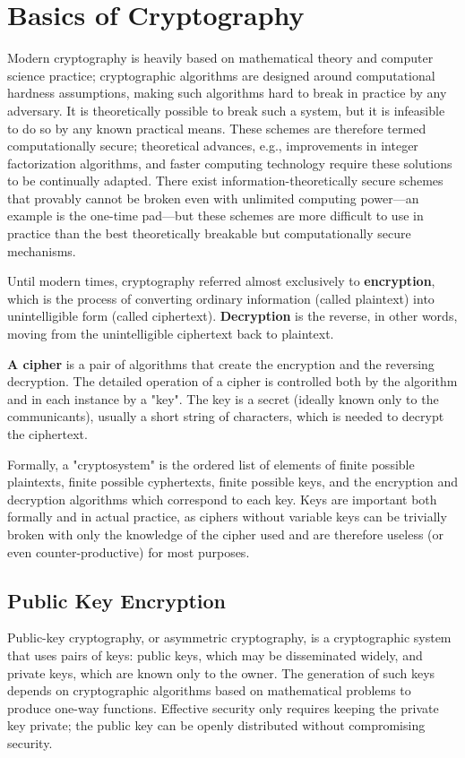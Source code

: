 \documentclass[a4paper]{article}
\begin{document}
  
  \newpage 
  \section{Basics of Cryptography}
  Modern cryptography is heavily based on mathematical theory and computer science practice; 
  cryptographic algorithms are designed around computational hardness assumptions, making such 
  algorithms hard to break in practice by any adversary. It is theoretically possible to break 
  such a system, but it is infeasible to do so by any known practical means. These schemes are 
  therefore termed computationally secure; theoretical advances, e.g., improvements in integer 
  factorization algorithms, and faster computing technology require these solutions to be 
  continually adapted. There exist information-theoretically secure schemes that provably 
  cannot be broken even with unlimited computing power—an example is the one-time pad—but 
  these schemes are more difficult to use in practice than the best theoretically breakable 
  but computationally secure mechanisms.

  Until modern times, cryptography referred almost exclusively to {\bfseries encryption}, 
  which is the process of converting ordinary information (called plaintext) into unintelligible form 
  (called ciphertext). {\bfseries Decryption} is the reverse, in other words, moving from the 
  unintelligible ciphertext back to plaintext. 
  
  {\bfseries A cipher} is a pair of algorithms that create the encryption and the reversing 
  decryption. The detailed operation of a cipher is controlled both by the algorithm and 
  in each instance by a "key". The key is a secret (ideally known only to the communicants), 
  usually a short string of characters, which is needed to decrypt the ciphertext. 
  
  Formally, a "cryptosystem" is the ordered list of elements of finite possible plaintexts, 
  finite possible cyphertexts, finite possible keys, and the encryption and decryption 
  algorithms which correspond to each key. Keys are important both formally and in actual 
  practice, as ciphers without variable keys can be trivially broken with only the knowledge 
  of the cipher used and are therefore useless (or even counter-productive) for most purposes.

    \subsection{Public Key Encryption}
    Public-key cryptography, or asymmetric cryptography, is a cryptographic system that uses 
    pairs of keys: public keys, which may be disseminated widely, and private keys, which are 
    known only to the owner. The generation of such keys depends on cryptographic algorithms 
    based on mathematical problems to produce one-way functions. Effective security only 
    requires keeping the private key private; the public key can be openly distributed 
    without compromising security.
\end{document}
